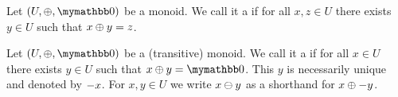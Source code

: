 \begin{definition}
Let $(U, \groupaddsym, \neutraladd)$ be a monoid.
We call it a  if for all $x, z \in U$ there exists $y \in U$ such that ${x} \oplus {y} = z$.
\end{definition}

\begin{definition}
Let $(U, \groupaddsym, \neutraladd)$ be a (transitive) monoid.
We call it a  if for all $x \in U$ there exists $y \in U$ such that $\groupadd{x}{y} = \neutraladd$.
This $y$ is necessarily unique and denoted by $-{x}$.
For $x, y \in U$ we write ${x} \ominus {y}$ as a shorthand for ${x} \oplus {-{y}}$.
\end{definition}




%
%
%
%
%
